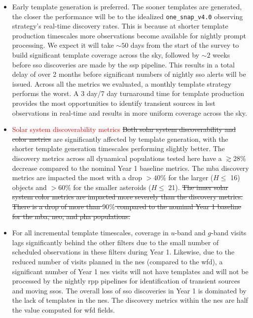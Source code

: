 \documentclass[preprintm,linenumbers]{aastex631}
\newcommand{\baseline}{\texttt{one\_snap\_v4.0}\xspace}
\providecommand{\red}[1]{\textcolor{red}{#1}}
\begin{document}
		\begin{itemize}
			\item Early template generation is preferred. The sooner templates are generated, the closer the performance will be to the idealized \baseline observing strategy's real-time discovery rates. This is because at shorter template production timescales more observations become available for nightly prompt processing. 
       We expect it will take $\sim50$ days from the start of the survey to build significant template coverage across the sky, followed by $\sim2$ weeks before  \gls*{sso} discoveries are made by the \gls*{ssp} pipeline.
       This results in a total delay of over 2 months before significant numbers of nightly \gls*{sso} alerts will be issued.
			 Across all the metrics we evaluated, a monthly template strategy performs the worst. A 3 day/7 day turnaround time for template production provides the most opportunities to identify transient sources in \gls*{lsst} observations in real-time and results in more uniform coverage across the sky. 
   

			\item \red{Solar system discoverability metrics} \sout{Both solar system discoverability and color metrics} are significantly affected by template generation, with the shorter template generation timescales performing slightly better. 
			 The discovery metrics across all dynamical populations tested here have a $\gtrsim28\%$ decrease compared to the nominal Year 1 baseline metrics. The \gls*{mba} discovery metrics are impacted the most with a drop $>40\%$ for the larger ($H \leq$ 16) objects and $>60\%$ for the smaller asteroids ($H \leq$ 21). 
			 \sout{The inner solar system color metrics are impacted more severely than the discovery metrics. There is a drop of more than $90\%$ compared to the nominal Year 1 baseline for the \gls*{mba}, \gls*{neo}, and \gls*{pha} populations.} 

			\item For all incremental template timescales, coverage in $u$-band and $g$-band visits lags significantly behind the other filters due to the small number of scheduled observations in these filters during Year 1. 
			 Likewise, due to the reduced number of visits planned in the \gls*{nes} (compared to the \gls*{wfd}), a significant number of Year 1 \gls*{nes} visits will not have templates and will not be processed by the nightly \gls*{rpp} pipelines for identification of transient sources and moving \glspl*{sso}.
                   The overall loss of \gls*{sso} discoveries in Year 1 is dominated by the lack of templates in the \gls*{nes}. The discovery metrics within the \gls*{nes} are half the value computed for \gls*{wfd} fields. 

                		\end{itemize}
\end{document}

